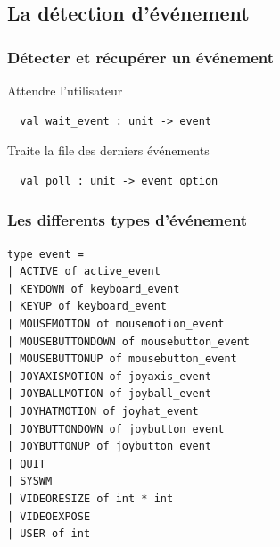 \subsection{La détection d'événement} %
\begin{frame}[fragile]
	\frametitle{Détecter et récupérer un événement}
	\begin{block}{Attendre l'utilisateur}
		\begin{lstlisting}
  val wait_event : unit -> event
		\end{lstlisting}
	\end{block}
	\begin{block}{Traite la file des derniers événements}
		\begin{lstlisting}
  val poll : unit -> event option
		\end{lstlisting}
	\end{block}
\end{frame}

\begin{frame}[fragile]
	\frametitle{Les differents types d'événement}
	\lstset{basicstyle=\small}
	\begin{lstlisting}
type event =
| ACTIVE of active_event
| KEYDOWN of keyboard_event
| KEYUP of keyboard_event
| MOUSEMOTION of mousemotion_event
| MOUSEBUTTONDOWN of mousebutton_event
| MOUSEBUTTONUP of mousebutton_event
| JOYAXISMOTION of joyaxis_event
| JOYBALLMOTION of joyball_event
| JOYHATMOTION of joyhat_event
| JOYBUTTONDOWN of joybutton_event
| JOYBUTTONUP of joybutton_event
| QUIT
| SYSWM
| VIDEORESIZE of int * int
| VIDEOEXPOSE
| USER of int
	\end{lstlisting}
\end{frame}

